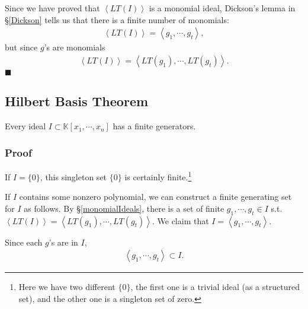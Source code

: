 \documentclass[11pt]{book}
\begin{document}
Since we have proved that $\left< LT(I) \right>$ is a monomial ideal, Dickson's lemma in \S\ref{Dickson} tells us that there is a finite number of monomials:
\begin{eqnarray}
\left< LT(I) \right> = \left< g_1, \cdots, g_t \right>,
\end{eqnarray}
but since $g$'s are monomials
\begin{eqnarray}
\left< LT(I) \right> = \left< LT(g_1), \cdots, LT(g_t) \right>.
\end{eqnarray}
$\blacksquare$

\subsection{Hilbert Basis Theorem}
\label{HilbertBasisTheorem}
Every ideal $I \subset \mathbb{K}[x_1, \cdots, x_{n}]$ has a finite generators.

\subsubsection{Proof}
If $I = \{0\}$, this singleton set $\{0\}$ is certainly finite.\footnote{Here we have two different $\{0\}$, the first one is a trivial ideal (as a structured set), and the other one is a singleton set of zero.}

If $I$ contains some nonzero polynomial, we can construct a finite generating set for $I$ as follows.
By \S\ref{monomialIdeals}, there is a set of finite $g_1, \cdots, g_t \in I$ s.t. $\left< LT(I) \right> = \left< LT(g_1), \cdots, LT(g_t) \right>$.
We claim that $I = \left< g_1, \cdots, g_t \right>$.

Since each $g$'s are in $I$, 
\begin{eqnarray}
\label{HilbertSubset}
\left< g_1, \cdots, g_t \right> \subset I.
\end{eqnarray}
\end{document}
